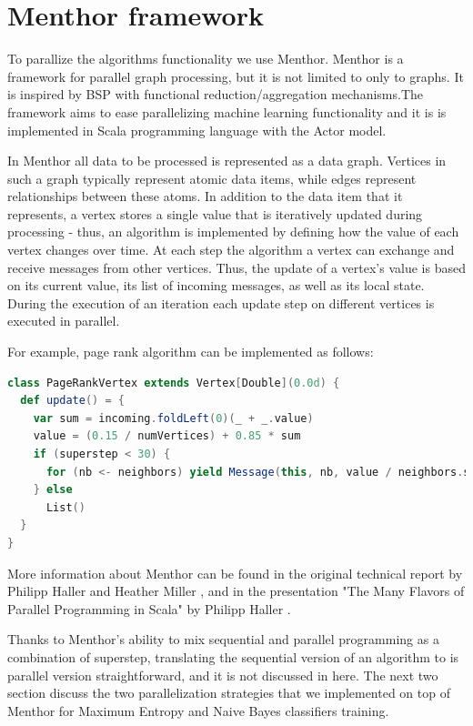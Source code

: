 \documentclass{report}
\begin{document}
\section{Menthor framework}

To parallize the algorithms functionality we use Menthor\cite{oai:infoscience.epfl.ch:165111}. Menthor is a framework for parallel graph processing, but it is not limited to only to graphs. It is inspired by BSP with functional reduction/aggregation mechanisms.The  framework aims to ease parallelizing machine learning functionality and it is is implemented in Scala programming language with the Actor model.

In Menthor all data to be processed is represented as a data graph. Vertices in such a graph typically represent atomic data items, while edges represent relationships between these atoms. In addition to the data item that it represents, a vertex stores a
single value that is iteratively updated during processing - thus, an algorithm is implemented by defining how the value of each vertex changes over time. At each step the algorithm a vertex can exchange and receive messages from other vertices. Thus, the update of a vertex’s value is based on its current value, its list of incoming messages, as well as its local state. During the execution of an iteration each update step on different vertices is executed in parallel.

For example, page rank algorithm can be implemented as follows:

\begin{lstlisting}[language=scala, caption={Page rank algorithm}, label={listing:pagerank}]
class PageRankVertex extends Vertex[Double](0.0d) {
  def update() = {
    var sum = incoming.foldLeft(0)(_ + _.value)
    value = (0.15 / numVertices) + 0.85 * sum
    if (superstep < 30) {
      for (nb <- neighbors) yield Message(this, nb, value / neighbors.size)
    } else
      List()
  }
}
\end{lstlisting}

More information about Menthor can be found in the original technical report by Philipp Haller and Heather Miller \cite{oai:infoscience.epfl.ch:165111}, and in the presentation "The Many Flavors of Parallel Programming in Scala" by Philipp Haller \cite{scalaparallel}.

Thanks to Menthor's ability to mix sequential and parallel programming as a combination of superstep, translating the sequential version of an algorithm to is parallel version straightforward, and it is not discussed in here. The next two section discuss the two parallelization strategies that we implemented on top of Menthor for Maximum Entropy and Naive Bayes classifiers training.
\end{document}
